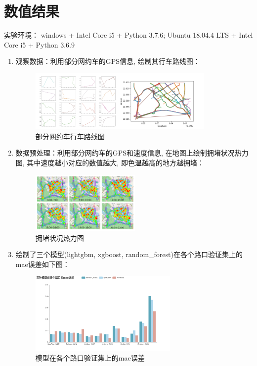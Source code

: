 \documentclass[a4paper,UTF8]{article}
\begin{document}
\section{数值结果}
实验环境： windows + Intel Core i5 + Python 3.7.6; Ubuntu 18.04.4 LTS + Intel Core i5 + Python 3.6.9
\begin{enumerate}
  \item 观察数据：利用部分网约车的GPS信息, 绘制其行车路线图：
  \begin{figure}[!htbp]
    \centering
    \includegraphics[height=3cm]{road_image.png}
    \caption{部分网约车行车路线图}
  \end{figure}
  \item 数据预处理：利用部分网约车的GPS和速度信息, 在地图上绘制拥堵状况热力图, 其中速度越小对应的数值越大, 即色温越高的地方越拥堵：
  \begin{figure}[!htbp]
    \centering
    \includegraphics[height=3cm]{heatmap.png}
    \caption{拥堵状况热力图}
  \end{figure}
  \item 绘制了三个模型(lightgbm, xgboost, random\_forest)在各个路口验证集上的mae误差如下图：
    \begin{figure}[!htbp]
      \centering
      \includegraphics[height=4cm]{bar.png}
      \caption{模型在各个路口验证集上的mae误差}
    \end{figure}
\end{enumerate}
\end{document}
